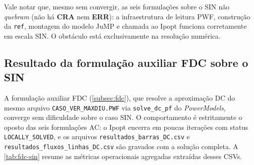 Vale notar que, mesmo sem convergir, as seis formulações sobre o SIN não \emph{quebram} (não há \textbf{CRA} nem \textbf{ERR}): a infraestrutura de leitura PWF, construção da \texttt{ref}, montagem do modelo JuMP e chamada ao Ipopt funciona corretamente em escala SIN. O obstáculo está exclusivamente na resolução numérica.

\subsection{Resultado da formulação auxiliar FDC sobre o SIN}
\label{subsec:fdc-resultado}

A formulação auxiliar FDC (\autoref{subsec:fdc}), que resolve a aproximação DC do mesmo arquivo \texttt{CASO\_\allowbreak VER\_MAXDIU.PWF} via \texttt{solve\_\allowbreak dc\_pf} do \textit{PowerModels}, converge sem dificuldade sobre o caso SIN. O comportamento é estritamente o oposto das seis formulações AC: o Ipopt encerra em poucas iterações com status \texttt{LOCALLY\_\allowbreak SOLVED}, e os arquivos \texttt{resultados\_\allowbreak barras\_DC.csv} e \texttt{resultados\_\allowbreak fluxos\_\allowbreak linhas\_DC.csv} são gravados com a solução completa. A \autoref{tab:fdc-sin} resume as métricas operacionais agregadas extraídas desses CSVs.

